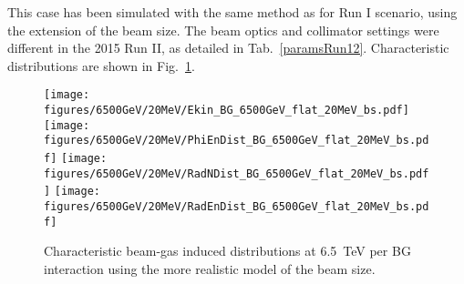 This case has been simulated with the same method as for Run I scenario, using the extension of the beam size. The beam optics and collimator settings were different in the 2015 Run II, as detailed in Tab.~\ref{paramsRun12}. Characteristic distributions are shown in Fig.~\ref{bg6500}.

\begin{figure}[!htb]
\begin{center}
  \texttt{[image: figures/6500GeV/20MeV/Ekin\_BG\_6500GeV\_flat\_20MeV\_bs.pdf]}
  \texttt{[image: figures/6500GeV/20MeV/PhiEnDist\_BG\_6500GeV\_flat\_20MeV\_bs.pdf]}
  \texttt{[image: figures/6500GeV/20MeV/RadNDist\_BG\_6500GeV\_flat\_20MeV\_bs.pdf]}
  \texttt{[image: figures/6500GeV/20MeV/RadEnDist\_BG\_6500GeV\_flat\_20MeV\_bs.pdf]}
\end{center}
\vspace{-0.6cm}
 \caption{Characteristic beam-gas induced distributions at 6.5~TeV per BG interaction using the more realistic model of the beam size.
  \label{bg6500}}
\end{figure}




